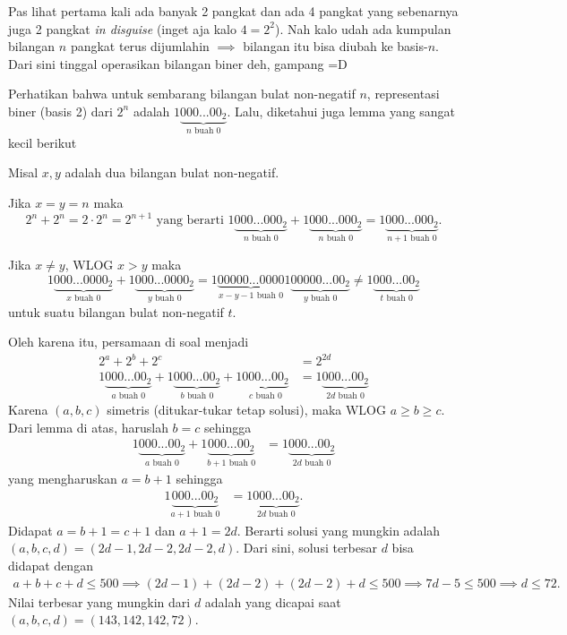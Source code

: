 
\begin{solusi}
    \begin{remark*}[Motivasi]
        Pas lihat pertama kali ada banyak 2 pangkat dan ada 4 pangkat yang sebenarnya juga 2 pangkat \textit{in disguise} (inget aja kalo $4 = 2^2$). Nah kalo udah ada kumpulan bilangan $n$ pangkat terus dijumlahin $\implies$ bilangan itu bisa diubah ke basis-$n$. Dari sini tinggal operasikan bilangan biner deh, gampang =D
    \end{remark*}
    Perhatikan bahwa untuk sembarang bilangan bulat non-negatif $n$, representasi biner (basis 2) dari $2^n$ adalah $1\underbrace{000...00_2}_{n \text{ buah } 0}$. Lalu, diketahui juga lemma yang sangat kecil berikut 
    \begin{lemma*}
        Misal $x,y$ adalah dua bilangan bulat non-negatif.
        
        Jika $x=y=n$ maka
        $$2^n + 2^n = 2 \cdot 2^n = 2^{n+1} \text{ yang berarti } 1\underbrace{000...000_2}_{n \text{ buah } 0} + 1\underbrace{000...000_2}_{n \text{ buah } 0} = 1\underbrace{000...000_2}_{n+1 \text{ buah } 0}.$$
        
        Jika $x \neq y$, WLOG $x > y$ maka 
        $$1\underbrace{000...0000_2}_{x \text{ buah } 0} + 1\underbrace{000...0000_2}_{y \text{ buah } 0} = 1\underbrace{00000...0000}_{x-y-1 \text{ buah } 0}1\underbrace{00000...00_2}_{y \text{ buah } 0} \neq 1\underbrace{000...00_2}_{t \text{ buah } 0}$$
        untuk suatu bilangan bulat non-negatif $t$.
    \end{lemma*}
    Oleh karena itu, persamaan di soal menjadi
    \begin{align*}
    2^a+2^b+2^c &= 2^{2d}\\
    1\underbrace{000...00_2}_{a \text{ buah } 0} + 1\underbrace{000...00_2}_{b \text{ buah } 0} + 1\underbrace{000...00_2}_{c \text{ buah } 0} &= 1\underbrace{000...00_2}_{2d \text{ buah } 0}
    \end{align*}
    Karena $(a,b,c)$ simetris (ditukar-tukar tetap solusi), maka WLOG $a \ge b \ge c$. Dari lemma di atas, haruslah $b=c$ sehingga
    \begin{align*}
    1\underbrace{000...00_2}_{a \text{ buah } 0} + 1\underbrace{000...00_2}_{b+1 \text{ buah } 0} &= 1\underbrace{000...00_2}_{2d \text{ buah } 0}
    \end{align*}
    yang mengharuskan $a=b+1$ sehingga
    \begin{align*}
    1\underbrace{000...00_2}_{a+1 \text{ buah } 0} &= 1\underbrace{000...00_2}_{2d \text{ buah } 0}.
    \end{align*}
    Didapat $a=b+1=c+1$ dan $a+1=2d$.
    Berarti solusi yang mungkin adalah $(a,b,c,d)=(2d-1, 2d-2, 2d-2, d)$. Dari sini, solusi terbesar $d$ bisa didapat dengan
    \begin{align*}
        a+b+c+d \le 500 \implies (2d-1)+(2d-2)+ (2d-2) + d \le 500 \implies 7d - 5 \le 500 \implies d \le 72.
    \end{align*}
    Nilai terbesar yang mungkin dari $d$ adalah  yang dicapai saat $(a,b,c,d)=(143,142,142,72)$.
\end{solusi}